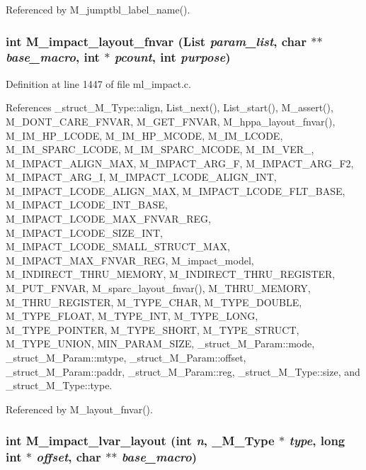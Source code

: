 Referenced by M\_\-jumptbl\_\-label\_\-name().
\subsubsection{\setlength{\rightskip}{0pt plus 5cm}int M\_\-impact\_\-layout\_\-fnvar (\bf{List} {\em param\_\-list}, char $\ast$$\ast$ {\em base\_\-macro}, int $\ast$ {\em pcount}, int {\em purpose})}\label{ml__impact_8c_1a7e47bb95219eb03a444e58530d142c}




Definition at line 1447 of file ml\_\-impact.c.

References \_\-struct\_\-M\_\-Type::align, List\_\-next(), List\_\-start(), M\_\-assert(), M\_\-DONT\_\-CARE\_\-FNVAR, M\_\-GET\_\-FNVAR, M\_\-hppa\_\-layout\_\-fnvar(), M\_\-IM\_\-HP\_\-LCODE, M\_\-IM\_\-HP\_\-MCODE, M\_\-IM\_\-LCODE, M\_\-IM\_\-SPARC\_\-LCODE, M\_\-IM\_\-SPARC\_\-MCODE, M\_\-IM\_\-VER\_, M\_\-IMPACT\_\-ALIGN\_\-MAX, M\_\-IMPACT\_\-ARG\_\-F, M\_\-IMPACT\_\-ARG\_\-F2, M\_\-IMPACT\_\-ARG\_\-I, M\_\-IMPACT\_\-LCODE\_\-ALIGN\_\-INT, M\_\-IMPACT\_\-LCODE\_\-ALIGN\_\-MAX, M\_\-IMPACT\_\-LCODE\_\-FLT\_\-BASE, M\_\-IMPACT\_\-LCODE\_\-INT\_\-BASE, M\_\-IMPACT\_\-LCODE\_\-MAX\_\-FNVAR\_\-REG, M\_\-IMPACT\_\-LCODE\_\-SIZE\_\-INT, M\_\-IMPACT\_\-LCODE\_\-SMALL\_\-STRUCT\_\-MAX, M\_\-IMPACT\_\-MAX\_\-FNVAR\_\-REG, M\_\-impact\_\-model, M\_\-INDIRECT\_\-THRU\_\-MEMORY, M\_\-INDIRECT\_\-THRU\_\-REGISTER, M\_\-PUT\_\-FNVAR, M\_\-sparc\_\-layout\_\-fnvar(), M\_\-THRU\_\-MEMORY, M\_\-THRU\_\-REGISTER, M\_\-TYPE\_\-CHAR, M\_\-TYPE\_\-DOUBLE, M\_\-TYPE\_\-FLOAT, M\_\-TYPE\_\-INT, M\_\-TYPE\_\-LONG, M\_\-TYPE\_\-POINTER, M\_\-TYPE\_\-SHORT, M\_\-TYPE\_\-STRUCT, M\_\-TYPE\_\-UNION, MIN\_\-PARAM\_\-SIZE, \_\-struct\_\-M\_\-Param::mode, \_\-struct\_\-M\_\-Param::mtype, \_\-struct\_\-M\_\-Param::offset, \_\-struct\_\-M\_\-Param::paddr, \_\-struct\_\-M\_\-Param::reg, \_\-struct\_\-M\_\-Type::size, and \_\-struct\_\-M\_\-Type::type.

Referenced by M\_\-layout\_\-fnvar().
\subsubsection{\setlength{\rightskip}{0pt plus 5cm}int M\_\-impact\_\-lvar\_\-layout (int {\em n}, \bf{\_\-M\_\-Type} $\ast$ {\em type}, long int $\ast$ {\em offset}, char $\ast$$\ast$ {\em base\_\-macro})}\label{ml__impact_8c_4bd8555cf87df1b9454f2434769496bc}




